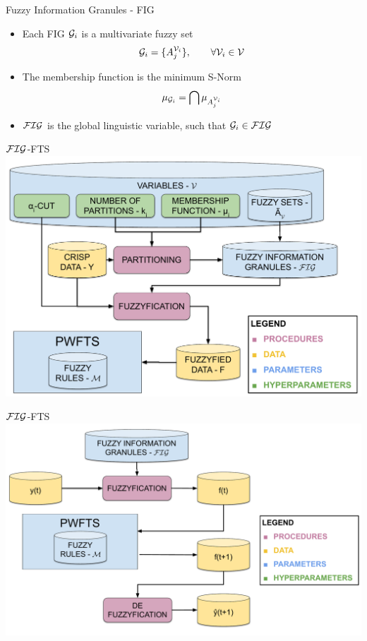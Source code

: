\documentclass{beamer}
\begin{document}

\begin{frame}{Fuzzy Information Granules - FIG}
\begin{itemize}
    \item Each FIG $\mathcal{G}_i$ is a multivariate fuzzy set
    $$\mathcal{G}_i = \{ A_j^{\mathcal{V}_i} \},\qquad \forall \mathcal{V}_i \in \mathcal{V}$$
    \item The membership function is the minimum S-Norm
    $$\mu_{\mathcal{G}_i} = \bigcap \mu_{A_j^{\mathcal{V}_i}}$$
    \item $\mathcal{FIG}$ is the global linguistic variable, such that $\mathcal{G}_i \in \mathcal{FIG}$
\end{itemize}
\end{frame}

\begin{frame}{$\mathcal{FIG}$-FTS}
\includegraphics[width=\textwidth]{figures/figfts_training_procedure.pdf}
\end{frame}

\begin{frame}{$\mathcal{FIG}$-FTS}
\includegraphics[width=\textwidth]{figures/figfts_forecasting_procedure.pdf}
\end{frame}
\end{document}
